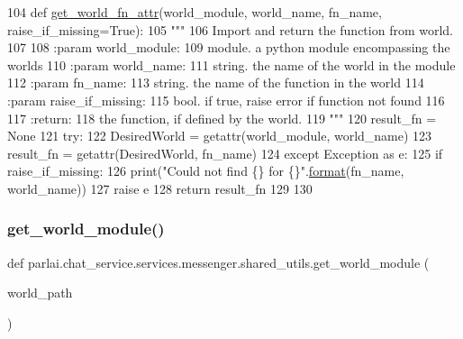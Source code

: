 \begin{DoxyCode}
104 \textcolor{keyword}{def }\hyperlink{namespaceparlai_1_1chat__service_1_1services_1_1messenger_1_1shared__utils_ade421ab07be47db0333a0fac599c07ef}{get\_world\_fn\_attr}(world\_module, world\_name, fn\_name, raise\_if\_missing=True):
105     \textcolor{stringliteral}{"""}
106 \textcolor{stringliteral}{    Import and return the function from world.}
107 \textcolor{stringliteral}{}
108 \textcolor{stringliteral}{    :param world\_module:}
109 \textcolor{stringliteral}{        module. a python module encompassing the worlds}
110 \textcolor{stringliteral}{    :param world\_name:}
111 \textcolor{stringliteral}{        string. the name of the world in the module}
112 \textcolor{stringliteral}{    :param fn\_name:}
113 \textcolor{stringliteral}{        string. the name of the function in the world}
114 \textcolor{stringliteral}{    :param raise\_if\_missing:}
115 \textcolor{stringliteral}{        bool. if true, raise error if function not found}
116 \textcolor{stringliteral}{}
117 \textcolor{stringliteral}{    :return:}
118 \textcolor{stringliteral}{        the function, if defined by the world.}
119 \textcolor{stringliteral}{    """}
120     result\_fn = \textcolor{keywordtype}{None}
121     \textcolor{keywordflow}{try}:
122         DesiredWorld = getattr(world\_module, world\_name)
123         result\_fn = getattr(DesiredWorld, fn\_name)
124     \textcolor{keywordflow}{except} Exception \textcolor{keyword}{as} e:
125         \textcolor{keywordflow}{if} raise\_if\_missing:
126             print(\textcolor{stringliteral}{"Could not find \{\} for \{\}"}.\hyperlink{namespaceparlai_1_1mturk_1_1core_1_1shared__utils_afcac728e96b38bbad8cde6f7be4f613e}{format}(fn\_name, world\_name))
127             \textcolor{keywordflow}{raise} e
128     \textcolor{keywordflow}{return} result\_fn
129 
130 
\end{DoxyCode}
\mbox{\label{namespaceparlai_1_1chat__service_1_1services_1_1messenger_1_1shared__utils_a6285f6c110c5c6fc4ab5d33aaac628f3}} 
\subsubsection{\texorpdfstring{get\+\_\+world\+\_\+module()}{get\_world\_module()}}
{\footnotesize\ttfamily def parlai.\+chat\+\_\+service.\+services.\+messenger.\+shared\+\_\+utils.\+get\+\_\+world\+\_\+module (\begin{DoxyParamCaption}\item[{}]{world\+\_\+path }\end{DoxyParamCaption})}

